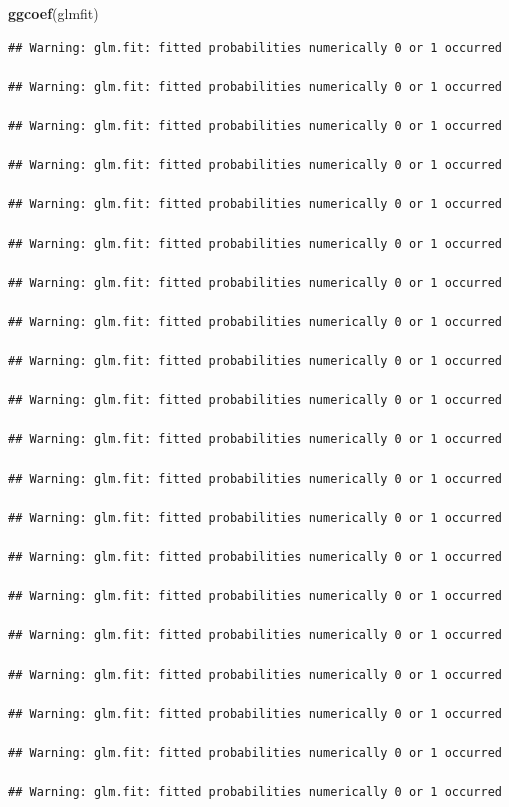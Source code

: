 \documentclass[]{article}
\newenvironment{Shaded}{\begin{snugshade}}{\end{snugshade}}
\newcommand{\KeywordTok}[1]{\textcolor[rgb]{0.13,0.29,0.53}{\textbf{#1}}}
\newcommand{\NormalTok}[1]{#1}
\begin{document}
\begin{Shaded}
\begin{Highlighting}[]
\KeywordTok{ggcoef}\NormalTok{(glmfit)}
\end{Highlighting}
\end{Shaded}

\begin{verbatim}
## Warning: glm.fit: fitted probabilities numerically 0 or 1 occurred

## Warning: glm.fit: fitted probabilities numerically 0 or 1 occurred

## Warning: glm.fit: fitted probabilities numerically 0 or 1 occurred

## Warning: glm.fit: fitted probabilities numerically 0 or 1 occurred

## Warning: glm.fit: fitted probabilities numerically 0 or 1 occurred

## Warning: glm.fit: fitted probabilities numerically 0 or 1 occurred

## Warning: glm.fit: fitted probabilities numerically 0 or 1 occurred

## Warning: glm.fit: fitted probabilities numerically 0 or 1 occurred

## Warning: glm.fit: fitted probabilities numerically 0 or 1 occurred

## Warning: glm.fit: fitted probabilities numerically 0 or 1 occurred

## Warning: glm.fit: fitted probabilities numerically 0 or 1 occurred

## Warning: glm.fit: fitted probabilities numerically 0 or 1 occurred

## Warning: glm.fit: fitted probabilities numerically 0 or 1 occurred

## Warning: glm.fit: fitted probabilities numerically 0 or 1 occurred

## Warning: glm.fit: fitted probabilities numerically 0 or 1 occurred

## Warning: glm.fit: fitted probabilities numerically 0 or 1 occurred

## Warning: glm.fit: fitted probabilities numerically 0 or 1 occurred

## Warning: glm.fit: fitted probabilities numerically 0 or 1 occurred

## Warning: glm.fit: fitted probabilities numerically 0 or 1 occurred

## Warning: glm.fit: fitted probabilities numerically 0 or 1 occurred
\end{verbatim}
\end{document}
